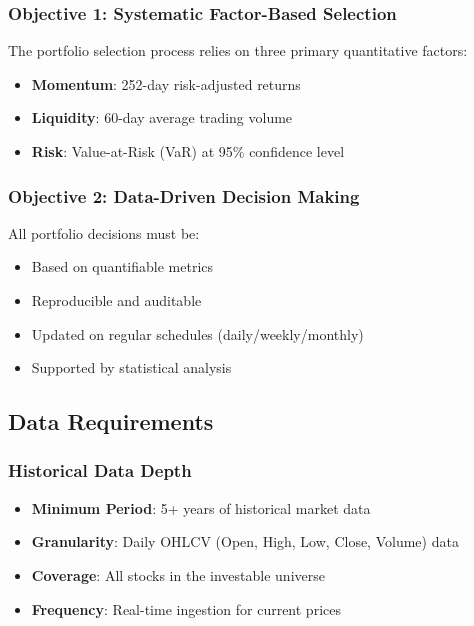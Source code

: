 \documentclass[11pt, a4paper, twoside]{article}
\begin{document}
\subsubsection{Objective 1: Systematic Factor-Based Selection}

The portfolio selection process relies on three primary quantitative factors:

\begin{itemize}
    \item \textbf{Momentum}: 252-day risk-adjusted returns
    \item \textbf{Liquidity}: 60-day average trading volume
    \item \textbf{Risk}: Value-at-Risk (VaR) at 95\% confidence level
\end{itemize}

\subsubsection{Objective 2: Data-Driven Decision Making}

All portfolio decisions must be:
\begin{itemize}
    \item Based on quantifiable metrics
    \item Reproducible and auditable
    \item Updated on regular schedules (daily/weekly/monthly)
    \item Supported by statistical analysis
\end{itemize}

\subsection{Data Requirements}

\subsubsection{Historical Data Depth}

\begin{itemize}
    \item \textbf{Minimum Period}: 5+ years of historical market data
    \item \textbf{Granularity}: Daily OHLCV (Open, High, Low, Close, Volume) data
    \item \textbf{Coverage}: All stocks in the investable universe
    \item \textbf{Frequency}: Real-time ingestion for current prices
\end{itemize}
\end{document}

